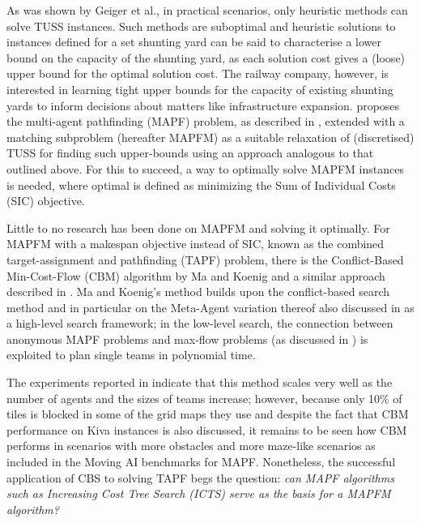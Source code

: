 \documentclass[english]{article}
\begin{document}
	As was shown by Geiger et al.\cite{geiger2018}, in practical scenarios, only heuristic methods can solve TUSS instances. 
	Such methods are suboptimal and heuristic solutions to instances defined for a set shunting yard can be said to characterise a lower bound on the capacity of the shunting yard, as each solution cost gives a (loose) upper bound for the optimal solution cost. 
	The railway company, however, is interested in learning tight upper bounds for the capacity of existing shunting yards to inform decisions about matters like infrastructure expansion. \cite{mulderij2020} proposes the multi-agent pathfinding (MAPF) problem, as described in \cite{stern2019}, extended with a matching subproblem (hereafter MAPFM) as a suitable relaxation of (discretised) TUSS for finding such upper-bounds using an approach analogous to that outlined above.
	For this to succeed, a way to optimally solve MAPFM instances is needed, where optimal is defined as minimizing the Sum of Individual Costs (SIC) objective.
	
	Little to no research has been done on MAPFM and solving it optimally. For MAPFM with a makespan objective instead of SIC, known as the combined target-assignment and pathfinding (TAPF) problem, there is the Conflict-Based Min-Cost-Flow (CBM) algorithm by Ma and Koenig \cite{ma2016} and a similar approach described in \cite{henkel2019}. Ma and Koenig's method builds upon the conflict-based search method and in particular on the Meta-Agent variation thereof also discussed in \cite{sharon2015} as a high-level search framework; in the low-level search, the connection between anonymous MAPF problems and max-flow problems (as discussed in \cite{yu2013}) is exploited to plan single teams in polynomial time. 
	
	The experiments reported in \cite{ma2016} indicate that this method scales very well as the number of agents and the sizes of teams increase; however, because only 10\% of tiles is blocked in some of the grid maps they use and despite the fact that CBM performance on Kiva\cite{wurman2007} instances is also discussed, it remains to be seen how CBM performs in scenarios with more obstacles and more maze-like scenarios as included in the Moving AI benchmarks \cite{sturtevant2012} for MAPF.
	Nonetheless, the successful application of CBS to solving TAPF begs the question: \textit{can MAPF algorithms such as Increasing Cost Tree Search (ICTS) \cite{sharon2011} serve as the basis for a MAPFM algorithm?}
	
\end{document}
